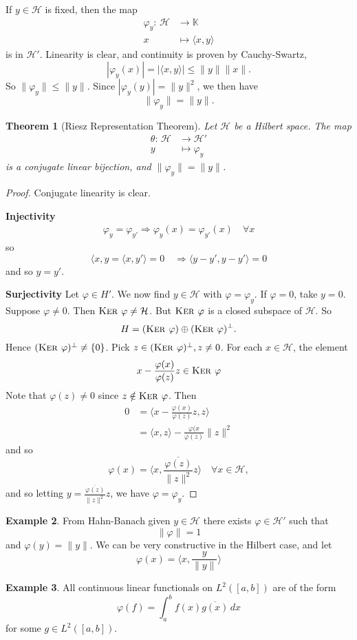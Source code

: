 \documentclass[justified]{tufte-book}
\theoremstyle{plain}%
\newtheorem{thm}{Theorem}[chapter]
\theoremstyle{definition}
\newtheorem{exmp}[thm]{Example}
\theoremstyle{remark}
\newcommand{\K}{\mathbb{K}}
\renewcommand{\H}{\mathcal{H}}
\newcommand{\mapping}[5]{\begin{align*}
#1 : \,     #2 &\rightarrow #3 \\
		#4  &\mapsto #5
\end{align*}	
}
\renewcommand{\phi}{\varphi}
\renewcommand{\ker}{\textsc{Ker\ }}
\begin{document}
If $y \in \H$ is fixed, then the map \mapping{\phi_y}{\H}{\K}{x}{\langle x, y \rangle} is in $\H'$.  Linearity is clear, and continuity is proven by Cauchy-Swartz, \[
  | \phi_y(x) | = | \langle x, y \rangle | \leq \| y \| \| x \|.
\] So $\| \phi_y \| \leq \| y \|$. Since $|\phi_y(y)| = \| y \|^2$, we then have \[
  \| \phi_y \| = \| y \|.
\]

\begin{thm}[Riesz Representation Theorem]
  Let $\H$ be a Hilbert space. The map \mapping{\theta}{\H}{\H'}{y}{\phi_y} is a conjugate linear bijection, and $\| \phi_y \| = \| y \|$.  
\end{thm}
\begin{proof}
  Conjugate linearity is clear.
  
  \textbf{Injectivity} 
  \begin{align*}
      \phi_y = \phi_{y'} \Rightarrow \phi_y(x) = \phi_{y'}(x) \quad \forall x
  \end{align*} so \[
      \langle x, y = \langle x, y' \rangle  = 0 \quad \Rightarrow \langle y - y', y - y' \rangle = 0
  \] and so $y = y'$.
  
  \textbf{Surjectivity}
  Let $\phi \in H'$.  We now find $y \in \H$ with $\phi = \phi_y$.  If $\phi = 0$, take $y = 0$.  Suppose $\phi \neq 0$.  Then $\ker \phi \neq \H$.  But $\ker \phi$ is a closed subspace of $\H$.  So \[
      H = (\ker \phi) \oplus (\ker \phi)^\perp.
  \] Hence $(\ker \phi)^\perp \neq \{ 0 \}$. Pick $z \in (\ker \phi)^\perp, z \neq 0$.  For each $x \in \H$, the element \[
      x - \frac{\phi(x)}{\phi(z)} z \in \ker \phi
  \] Note that $\phi(z) \neq 0$ since $z \notin \ker \phi$.  Then \begin{align*}
      0   &=  \langle x - \frac{\phi(x)}{\phi(z)}z, z \rangle \\
          &= \langle x, z \rangle - \frac{\phi(x}{\phi(z)} \| z \|^2
  \end{align*}
  and so \[
  \phi(x) = \langle x, \frac{\overline{\phi(z)}}{\| z \|^2} z \rangle \quad \forall x \in \H,\]
  and so letting $y = \frac{\overline{\phi(z)}}{\| z \|^2} z$, we have $\phi = \phi_y$.  
\end{proof}

\begin{exmp}
  From Hahn-Banach given $y \in \H$ there exists $\phi \in \H'$ such that \[
      \| \phi \| = 1
  \] and $\phi(y) = \| y \|$. We can be very constructive in the Hilbert case, and let \[
      \phi(x) = \langle x, \frac{y}{\| y \|} \rangle
  \] 
\end{exmp}
\begin{exmp}
  All continuous linear functionals on $L^2([a,b])$ are of the form \[
      \phi(f) = \int_a^b f(x) \overline{g(x)} \, dx 
  \] for some $g \in L^2([a,b])$.
\end{exmp}
\end{document}
